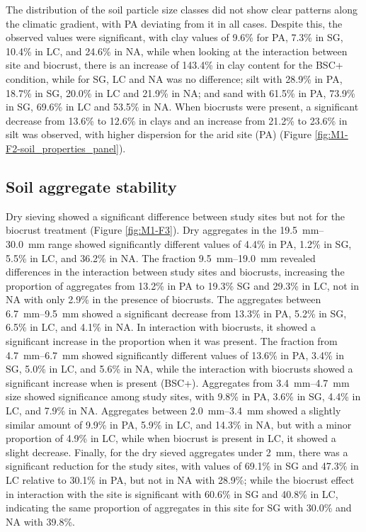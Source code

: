The distribution of the soil particle size classes did not show clear patterns along the climatic gradient, with PA deviating from it in all cases. Despite this, the observed values were significant, with clay values of 9.6\% for PA, 7.3\% in SG, 10.4\% in LC, and 24.6\% in NA, while when looking at the interaction between site and biocrust, there is an increase of 143.4\% in clay content for the BSC+ condition, while for SG, LC and NA was no difference; silt with 28.9\% in PA, 18.7\% in SG, 20.0\% in LC and 21.9\% in NA; and sand with 61.5\% in PA, 73.9\% in SG, 69.6\% in LC and 53.5\% in NA. When biocrusts were present, a significant decrease from 13.6\% to 12.6\% in clays and an increase from 21.2\% to 23.6\% in silt was observed, with higher dispersion for the arid site (PA) (Figure \ref{fig:M1-F2-soil_properties_panel}).

\subsection{Soil aggregate stability}

Dry sieving showed a significant difference between study sites but not for the biocrust treatment (Figure \ref{fig:M1-F3}). Dry aggregates in the \SIrange[range-phrase=--,range-units=single]{19.5}{30.0}{\milli\meter} range showed significantly different values of 4.4\% in PA, 1.2\% in SG, 5.5\% in LC, and 36.2\% in NA. The fraction \SIrange[range-phrase=--,range-units=single]{9.5}{19.0}{\milli\meter} revealed differences in the interaction between study sites and biocrusts, increasing the proportion of aggregates from 13.2\% in PA to 19.3\% SG and 29.3\% in LC, not in NA with only 2.9\% in the presence of biocrusts. The aggregates between \SIrange[range-phrase=--,range-units=single]{6.7}{9.5}{\milli\meter} showed a significant decrease from 13.3\% in PA, 5.2\% in SG, 6.5\% in LC, and 4.1\% in NA. In interaction with biocrusts, it showed a significant increase in the proportion when it was present. The fraction from \SIrange[range-phrase=--,range-units=single]{4.7}{6.7}{\milli\meter} showed significantly different values of 13.6\% in PA, 3.4\% in SG, 5.0\% in LC, and 5.6\% in NA, while the interaction with biocrusts showed a significant increase when is present (BSC+). Aggregates from \SIrange[range-phrase=--,range-units=single]{3.4}{4.7}{\milli\meter} size showed significance among study sites, with 9.8\% in PA, 3.6\% in SG, 4.4\% in LC, and 7.9\% in NA. Aggregates between \SIrange[range-phrase=--,range-units=single]{2.0}{3.4}{\milli\meter} showed a slightly similar amount of 9.9\% in PA, 5.9\% in LC, and 14.3\% in NA, but with a minor proportion of 4.9\% in LC, while when biocrust is present in LC, it showed a slight decrease. Finally, for the dry sieved aggregates under \SI{2}{\milli\meter}, there was a significant reduction for the study sites, with values of 69.1\% in SG and 47.3\% in LC relative to 30.1\% in PA, but not in NA with 28.9\%; while the biocrust effect in interaction with the site is significant with 60.6\% in SG and 40.8\% in LC, indicating the same proportion of aggregates in this site for SG with 30.0\% and NA with 39.8\%.

